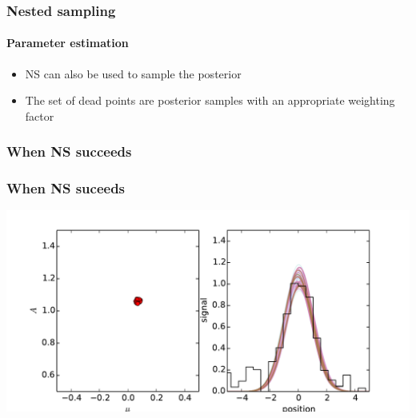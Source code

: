 \documentclass[]{beamer}
\begin{document}
\begin{frame}
  \frametitle{Nested sampling} 
  \framesubtitle{Parameter estimation} 

  \begin{itemize}
      \pause
    \item NS can also be used to sample the posterior
      \pause
    \item The set of dead points are posterior samples with an appropriate weighting factor
  \end{itemize}
 
\end{frame}


\begin{frame}
  \frametitle{When NS succeeds} 
\end{frame}
\begin{frame}
  \frametitle{When NS suceeds} 
  \includegraphics[width=\textwidth]{movies/NS_1.pdf}
\end{frame}
\end{document}
